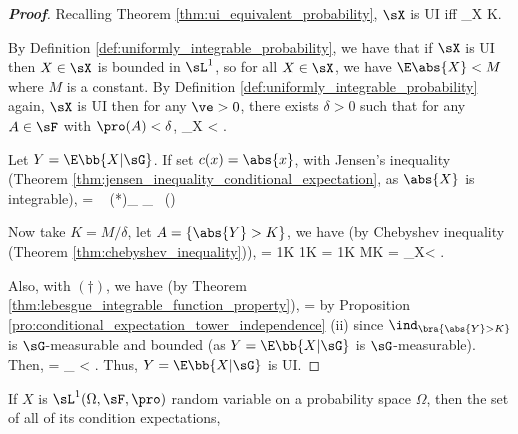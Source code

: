 \begin{proof}[\bf Proof]
Recalling Theorem \ref{thm:ui_equivalent_probability}, $\sX$ is UI iff
\be
\sup\limits_{X\in \sX} \E{}  K\to \infty.
\ee

By Definition \ref{def:uniformly_integrable_probability}, we have that if $\sX$ is UI then $X\in \sX$ is bounded in $\sL^1$, so for all $X\in \sX$, we have
$\E\abs{X} < M$ where $M$ is a constant. By Definition \ref{def:uniformly_integrable_probability} again, $\sX$ is UI then for any $\ve>0$, there exists $\delta >0$ such that for any $A\in \sF$ with $\pro(A) <\delta$,
\be
\sup_{X\in \sX} < \ve.
\ee

Let $Y= \E\bb{X|\sG}$. If set $c(x) = \abs{x}$, with Jensen's inequality (Theorem \ref{thm:jensen_inequality_conditional_expectation}, as $\abs{X}$ is integrable),
\be
{} =  \leq \E{}\  \quad (*)\quad\ra\quad  {}\ind_{} \leq \E{}\ind_{}\  \quad (\dag)
\ee

Now take $K = M/\delta$, let $A = \{\abs{Y} > K\}$, we have (by Chebyshev inequality (Theorem \ref{thm:chebyshev_inequality})),
\be
\pro{} = \pro{} \leq \frac 1K \E{} \stackrel{(*)}{\leq} \frac 1K\E{} = \frac 1K\E{} \leq \frac MK = \delta \quad\ra\quad \sup_{X\in \sX}< \ve.
\ee

Also, with $(\dag)$, we have (by Theorem \ref{thm:lebesgue_integrable_function_property}),
\be
\E{} \leq \E{} = \E{}
\ee
by Proposition \ref{pro:conditional_expectation_tower_independence} (ii) since $\ind_{\bra{\abs{Y}>K}}$ is $\sG$-measurable and bounded (as $Y = \E\bb{X|\sG}$ is $\sG$-measurable). Then,
\be
\E{} \leq \E{} = _{} < \ve.
\ee
Thus, $Y = \E\bb{X|\sG}$ is UI.
\end{proof}

\begin{corollary}\label{cor:single_integrable_conditional_expectation_implies_ui}
If $X$ is $\sL^1(\Omega,\sF,\pro)$ random variable on a probability space $\Omega$, then the set of all of its condition expectations,
\be
{}\quad {}
\ee
\end{corollary}

